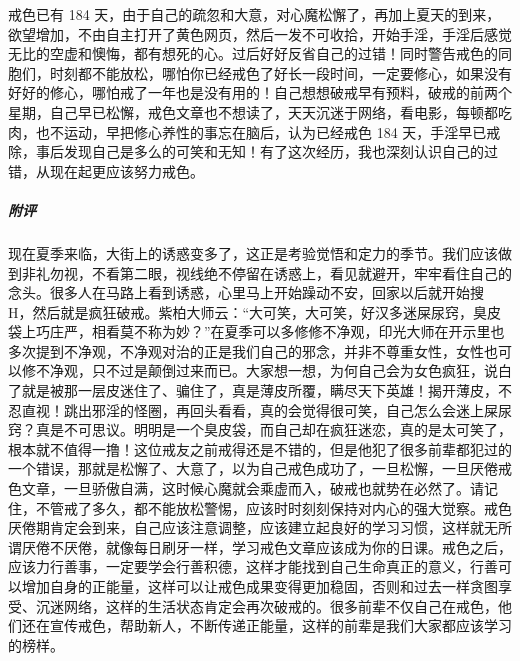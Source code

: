 \begin{case}
    戒色已有 184 天，由于自己的疏忽和大意，对心魔松懈了，再加上夏天的到来，欲望增加，不由自主打开了黄色网页，然后一发不可收拾，开始手淫，手淫后感觉无比的空虚和懊悔，都有想死的心。过后好好反省自己的过错！同时警告戒色的同胞们，时刻都不能放松，哪怕你已经戒色了好长一段时间，一定要修心，如果没有好好的修心，哪怕戒了一年也是没有用的！自己想想破戒早有预料，破戒的前两个星期，自己早已松懈，戒色文章也不想读了，天天沉迷于网络，看电影，每顿都吃肉，也不运动，早把修心养性的事忘在脑后，认为已经戒色 184 天，手淫早已戒除，事后发现自己是多么的可笑和无知！有了这次经历，我也深刻认识自己的过错，从现在起更应该努力戒色。
    \subparagraph{附评} 现在夏季来临，大街上的诱惑变多了，这正是考验觉悟和定力的季节。我们应该做到非礼勿视，不看第二眼，视线绝不停留在诱惑上，看见就避开，牢牢看住自己的念头。很多人在马路上看到诱惑，心里马上开始躁动不安，回家以后就开始搜 H，然后就是疯狂破戒。紫柏大师云：“大可笑，大可笑，好汉多迷屎尿窍，臭皮袋上巧庄严，相看莫不称为妙？”在夏季可以多修修不净观，印光大师在开示里也多次提到不净观，不净观对治的正是我们自己的邪念，并非不尊重女性，女性也可以修不净观，只不过是颠倒过来而已。大家想一想，为何自己会为女色疯狂，说白了就是被那一层皮迷住了、骗住了，真是薄皮所覆，瞒尽天下英雄！揭开薄皮，不忍直视！跳出邪淫的怪圈，再回头看看，真的会觉得很可笑，自己怎么会迷上屎尿窍？真是不可思议。明明是一个臭皮袋，而自己却在疯狂迷恋，真的是太可笑了，根本就不值得一撸！这位戒友之前戒得还是不错的，但是他犯了很多前辈都犯过的一个错误，那就是松懈了、大意了，以为自己戒色成功了，一旦松懈，一旦厌倦戒色文章，一旦骄傲自满，这时候心魔就会乘虚而入，破戒也就势在必然了。请记住，不管戒了多久，都不能放松警惕，应该时时刻刻保持对内心的强大觉察。戒色厌倦期肯定会到来，自己应该注意调整，应该建立起良好的学习习惯，这样就无所谓厌倦不厌倦，就像每日刷牙一样，学习戒色文章应该成为你的日课。戒色之后，应该力行善事，一定要学会行善积德，这样才能找到自己生命真正的意义，行善可以增加自身的正能量，这样可以让戒色成果变得更加稳固，否则和过去一样贪图享受、沉迷网络，这样的生活状态肯定会再次破戒的。很多前辈不仅自己在戒色，他们还在宣传戒色，帮助新人，不断传递正能量，这样的前辈是我们大家都应该学习的榜样。
\end{case}


